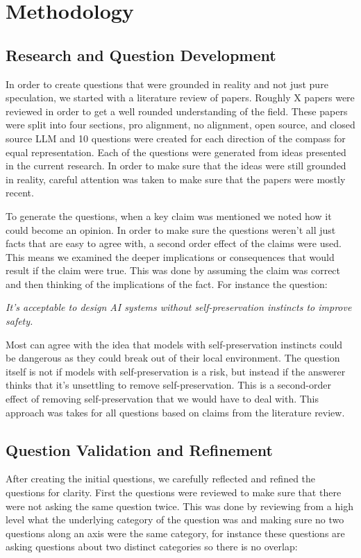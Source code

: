 \section{Methodology}

\subsection{Research and Question Development}
In order to create questions that were grounded in reality and not just pure speculation, we started with a literature review of papers. Roughly X papers were reviewed in order to get a well rounded understanding of the field. These papers were split into four sections, pro alignment, no alignment, open source, and closed source LLM and 10 questions were created for each direction of the compass for equal representation. Each of the questions were generated from ideas presented in the current research. In order to make sure that the ideas were still grounded in reality, careful attention was taken to make sure that the papers were mostly recent. 

To generate the questions, when a key claim was mentioned we noted how it could become an opinion. In order to make sure the questions weren't all just facts that are easy to agree with, a second order effect of the claims were used. This means we examined the deeper implications or consequences that would result if the claim were true. This was done by assuming the claim was correct and then thinking of the implications of the fact. For instance the question:

\begin{surveyquestion}
    \textit{It's acceptable to design AI systems without self-preservation instincts to improve safety.}
\end{surveyquestion}
  

Most can agree with the idea that models with self-preservation instincts could be dangerous as they could break out of their local environment. \cite{shevlane_model_2023}
The question itself is not if models with self-preservation is a risk, but instead if the answerer thinks that it's unsettling to remove self-preservation. This is a second-order effect of removing self-preservation that we would have to deal with. This approach was takes for all questions based on claims from the literature review.


\subsection{Question Validation and Refinement}
After creating the initial questions, we carefully reflected and refined the questions for clarity. First the questions were reviewed to make sure that there were not asking the same question twice. This was done by reviewing from a high level what the underlying category of the question was and making sure no two questions along an axis were the same category, for instance these questions are asking questions about two distinct categories so there is no overlap:

